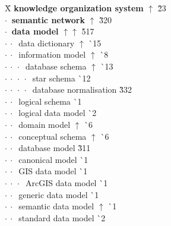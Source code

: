 \begin{tabbing}
\hspace*{58mm}X\= \kill
 \textbf{knowledge organization system} $\uparrow$ \` 2{\raisebox{.4\height}{\scalebox{.6}{+}}}3\\
$\cdot\:$  \textbf{semantic network} $\uparrow$ \` 3{\raisebox{.4\height}{\scalebox{.6}{+}}}20\\
$\cdot\:$  \textbf{data model} $\uparrow\uparrow$ \` 5{\raisebox{.4\height}{\scalebox{.6}{+}}}17\\
$\cdot\:\cdot\:$  data dictionary $\uparrow$ \` {\raisebox{.4\height}{\scalebox{.6}{+}}}15\\
$\cdot\:\cdot\:$  information model $\uparrow$ \` {\raisebox{.4\height}{\scalebox{.6}{+}}}8\\
$\cdot\:\cdot\:\cdot\:$  database schema $\uparrow$ \` {\raisebox{.4\height}{\scalebox{.6}{+}}}13\\
$\cdot\:\cdot\:\cdot\:\cdot\:$  star schema  \` {\raisebox{.4\height}{\scalebox{.6}{+}}}12\\
$\cdot\:\cdot\:\cdot\:\cdot\:$  database normalisation  \` 3{\raisebox{.4\height}{\scalebox{.6}{+}}}32\\
$\cdot\:\cdot\:$  logical schema  \` {\raisebox{.4\height}{\scalebox{.6}{+}}}1\\
$\cdot\:\cdot\:$  logical data model  \` {\raisebox{.4\height}{\scalebox{.6}{+}}}2\\
$\cdot\:\cdot\:$  domain model $\uparrow$ \` {\raisebox{.4\height}{\scalebox{.6}{+}}}6\\
$\cdot\:\cdot\:$  conceptual schema $\uparrow$ \` {\raisebox{.4\height}{\scalebox{.6}{+}}}6\\
$\cdot\:\cdot\:$  database model  \` 3{\raisebox{.4\height}{\scalebox{.6}{+}}}11\\
$\cdot\:\cdot\:$  canonical model  \` {\raisebox{.4\height}{\scalebox{.6}{+}}}1\\
$\cdot\:\cdot\:$  GIS data model  \` {\raisebox{.4\height}{\scalebox{.6}{+}}}1\\
$\cdot\:\cdot\:\cdot\:$  ArcGIS data model  \` {\raisebox{.4\height}{\scalebox{.6}{+}}}1\\
$\cdot\:\cdot\:$  generic data model  \` {\raisebox{.4\height}{\scalebox{.6}{+}}}1\\
$\cdot\:\cdot\:$  semantic data model $\uparrow$ \` {\raisebox{.4\height}{\scalebox{.6}{+}}}1\\
$\cdot\:\cdot\:$  standard data model  \` {\raisebox{.4\height}{\scalebox{.6}{+}}}2\\

\end{tabbing}
